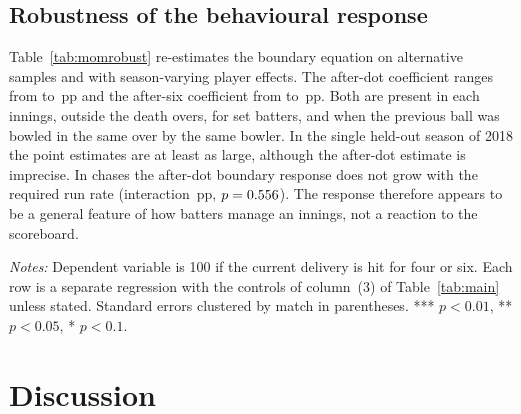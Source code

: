 \documentclass[11pt]{article}
\newcommand{\pp}{\,pp}
\begin{document}
\subsection{Robustness of the behavioural response}

Table~\ref{tab:momrobust} re-estimates the boundary equation on alternative samples and with season-varying player effects. The after-dot coefficient ranges from \RbDotMin{} to \RbDotMax\pp{} and the after-six coefficient from \RbSixMin{} to \RbSixMax\pp{}. Both are present in each innings, outside the death overs, for set batters, and when the previous ball was bowled in the same over by the same bowler. In the single held-out season of 2018 the point estimates are at least as large, although the after-dot estimate is imprecise. In chases the after-dot boundary response does not grow with the required run rate (interaction \HetDotHi\pp{}, $p=0.556$). The response therefore appears to be a general feature of how batters manage an innings, not a reaction to the scoreboard.

\begin{table}[tbp]
\centering
\begin{threeparttable}
\caption{Robustness of the boundary response}\label{tab:momrobust}
\footnotesize
\setlength{\tabcolsep}{4pt}

\begin{tablenotes}[flushleft]\footnotesize
\item \emph{Notes:} Dependent variable is 100 if the current delivery is hit for four or six. Each row is a separate regression with the controls of column~(3) of Table~\ref{tab:main} unless stated. Standard errors clustered by match in parentheses. *** $p<0.01$, ** $p<0.05$, * $p<0.1$.
\end{tablenotes}
\end{threeparttable}
\end{table}

\section{Discussion}\label{sec:discussion}
\end{document}
